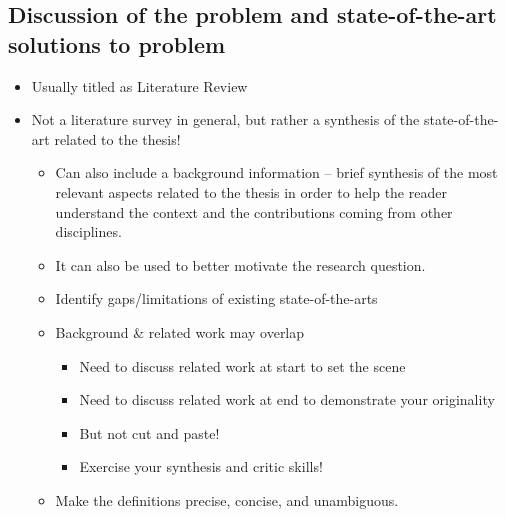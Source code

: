 \documentclass{utmthesis}
\begin{document}
\subsection{Discussion of the problem and state-of-the-art solutions to problem }
\begin{itemize}
\item Usually titled as Literature Review
\item Not a literature survey in general, but rather a synthesis of the
state-of-the-art related to the thesis!
\begin{itemize}
\item Can also include a background information -- brief synthesis of the
most relevant aspects related to the thesis in order to help the reader
understand the context and the contributions coming from other disciplines.
\item It can also be used to better motivate the research question.
\item Identify gaps/limitations of existing state-of-the-arts
\item Background \& related work may overlap
\begin{itemize}
\item Need to discuss related work at start to set the scene
\item Need to discuss related work at end to demonstrate your originality
\item But not cut and paste!
\item Exercise your synthesis and critic skills!
\end{itemize}
\item Make the definitions precise, concise, and unambiguous. 
\end{itemize}
\end{itemize}
\end{document}
